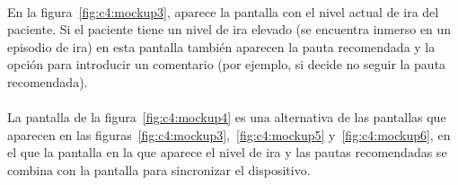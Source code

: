 \paragraph{}
En la figura~\ref{fig:c4:mockup3}, aparece la pantalla con el nivel actual de ira del paciente. Si el paciente tiene un nivel de ira elevado (se encuentra inmerso en un episodio de ira) en esta pantalla también aparecen la pauta recomendada y la opción para introducir un comentario (por ejemplo, si decide no seguir la pauta recomendada).

\paragraph{}
La pantalla de la figura~\ref{fig:c4:mockup4} es una alternativa de las pantallas que aparecen en las figuras~\ref{fig:c4:mockup3},~\ref{fig:c4:mockup5} y~\ref{fig:c4:mockup6}, en el que la pantalla en la que aparece el nivel de ira y las pautas recomendadas se combina con la pantalla para sincronizar el dispositivo.

